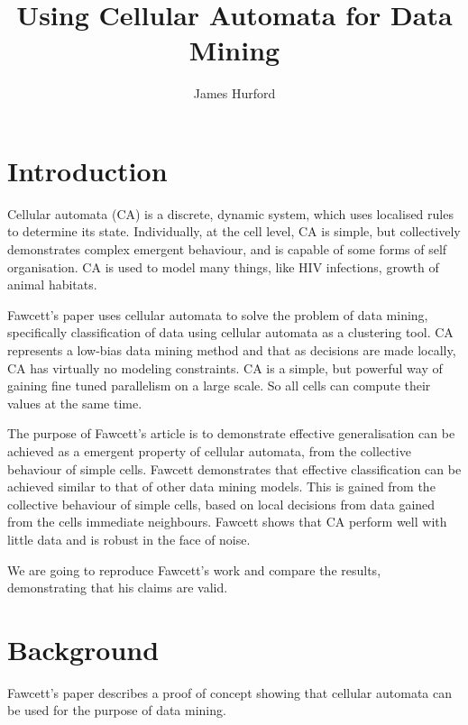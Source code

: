 \documentclass[11pt]{article}
\title{Using Cellular Automata for Data Mining}
\author{James Hurford}
\date{}
\begin{document}
\maketitle

\setcounter{tocdepth}{3}
\tableofcontents
\vspace*{1cm}


\section{Introduction}
\label{sec-1}

  Cellular automata (CA) is a discrete, dynamic system, which uses
  localised rules to determine its state.  Individually, at the cell
  level, CA is simple, but collectively demonstrates complex emergent
  behaviour, and is capable of some forms of self organisation.  CA is
  used to model many things, like HIV infections, growth of animal
  habitats.

  Fawcett's \cite{fawcett08} paper uses cellular automata to solve the
  problem of data mining, specifically classification of data using
  cellular automata as a clustering tool.  CA represents a low-bias
  data mining method and that as decisions are made locally, CA has
  virtually no modeling constraints.  CA is a simple, but powerful way
  of gaining fine tuned parallelism on a large scale. So all cells
  can compute their values at the same time.

  The purpose of Fawcett's \cite{fawcett08} article is to demonstrate
  effective generalisation can be achieved as a emergent property of
  cellular automata, from the collective behaviour of simple cells.
  Fawcett \cite{fawcett08} demonstrates that effective classification
  can be achieved similar to that of other data mining models.  This
  is gained from the collective behaviour of simple cells, based on
  local decisions from data gained from the cells immediate
  neighbours.  Fawcett shows that CA perform well with little data and
  is robust in the face of noise.

  We are going to reproduce Fawcett's \cite{fawcett08} work and compare the results,
  demonstrating that his claims are valid.

  
\section{Background}
\label{sec-2}

  Fawcett's \cite{fawcett08} paper describes a proof of concept showing that cellular
  automata can be used for the purpose of data mining.
  
\end{document}
